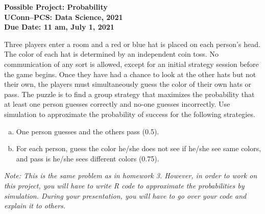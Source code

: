 \documentclass[12pt]{article}
\begin{document}
\begin{center}
  \bf Possible Project: Probability\\
  UConn--PCS: Data Science, 2021\\
  Due Date: 11 am, July 1, 2021
\end{center}

Three players enter a room and a red or blue hat is placed on each
person's head.  The color of each hat is determined by an independent coin
toss. No communication of any sort is allowed, except for an initial strategy
session before the game begins.  Once they have had a chance to look at the
other hats but not their own, the players must simultaneously guess the
color of their own hats or pass. The puzzle is to find a group strategy that
maximizes the probability that at least one person guesses correctly and
no-one guesses incorrectly. Use simulation to approximate the probability of success for the following strategies.
\begin{enumerate}[a.]
\item One person guesses and the others pass (0.5). 
\item For each person, guess the color he/she does
  not see if he/she see same colors, and pass is he/she sees different
  colors (0.75).
\end{enumerate}

{\it Note: This is the same problem as in homework 3. However, in order to work on this project, you will have to write R code to approximate the probabilities by simulation. During your presentation, you will have to go over your code and explain it to others.}
\end{document}
